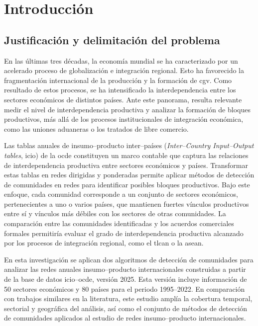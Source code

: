 \chapter{Introducción}


\section{Justificación y delimitación del problema}

En las últimas tres décadas, la economía mundial se ha caracterizado por un acelerado proceso de globalización e integración regional. Esto ha favorecido la fragmentación internacional de la producción y la formación de \gls{cgv}. Como resultado de estos procesos, se ha intensificado la interdependencia entre los sectores económicos de distintos países. Ante este panorama, resulta relevante medir el nivel de interdependencia productiva y analizar la formación de bloques productivos, más allá de los procesos institucionales de integración económica, como las uniones aduaneras o los tratados de libre comercio.

Las tablas anuales de insumo--producto inter--países (\textit{Inter--Country Input--Output tables}, \acrshort{icio}) de la \gls{ocde} constituyen un marco contable que captura las relaciones de interdependencia productiva entre sectores económicos y países. Transformar estas tablas en redes dirigidas y ponderadas permite aplicar métodos de detección de comunidades en redes para identificar posibles bloques productivos. Bajo este enfoque, cada comunidad corresponde a un conjunto de sectores económicos, pertenecientes a uno o varios países, que mantienen fuertes vínculos productivos entre sí y vínculos más débiles con los sectores de otras comunidades. La comparación entre las comunidades identificadas y los acuerdos comerciales formales permitiría evaluar el grado de interdependencia productiva alcanzado por los procesos de integración regional, como el \gls{tlcan} o la \gls{asean}.

En esta investigación se aplican dos algoritmos de detección de comunidades para analizar las redes anuales insumo--producto internacionales construidas a partir de la base de datos \acrshort{icio}--\gls{ocde}, versión 2025. Esta versión incluye información de 50 sectores económicos y 80 países para el periodo 1995--2022. En comparación con trabajos similares en la literatura, este estudio amplía la cobertura temporal, sectorial y geográfica del análisis, así como el conjunto de métodos de detección de comunidades aplicados al estudio de redes insumo--producto internacionales.

